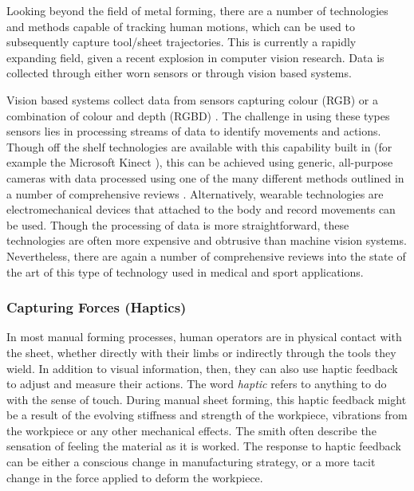 Looking beyond the field of metal forming, there are a number of technologies and methods capable of tracking human motions, which can be used to subsequently capture tool/sheet trajectories. This is currently a rapidly expanding field, given a recent explosion in computer vision research. Data is collected through either worn sensors or through vision based systems.

Vision based systems collect data from sensors capturing colour (RGB) or a combination of colour and depth (RGBD) \citep{Zhang2019AMethods}. The challenge in using these types sensors lies in processing streams of data to identify movements and actions. Though off the shelf technologies are available with this capability built in (for example the Microsoft Kinect \citep{Shotton2011Real-timeImages}), this can be achieved using generic, all-purpose cameras with data processed using one of the many different methods outlined in a number of comprehensive reviews \citep{Zhang2019AMethods,Beddiar2020Vision-basedSurvey}. Alternatively, wearable technologies are electromechanical devices that attached to the body and record movements can be used. Though the processing of data is more straightforward, these technologies are often more expensive and obtrusive than machine vision systems. Nevertheless, there are again a number of comprehensive reviews into the state of the art of this type of technology used in medical \citep{Homayounfar2020WearableChallenges} and sport \citep{Taborri2020SportOverview} applications.

\subsubsection{Capturing Forces (Haptics)}
In most manual forming processes, human operators are in physical contact with the sheet, whether directly with their limbs or indirectly through the tools they wield. In addition to visual information, then, they can also use haptic feedback to adjust and measure their actions. The word \textit{haptic} refers to anything to do with the sense of touch. During manual sheet forming, this haptic feedback might be a result of the evolving stiffness and strength of the workpiece, vibrations from the workpiece or any other mechanical effects. The smith often describe the sensation of feeling the material as it is worked. The response to haptic feedback can be either a conscious change in manufacturing strategy, or a more tacit change in the force applied to deform the workpiece. 

